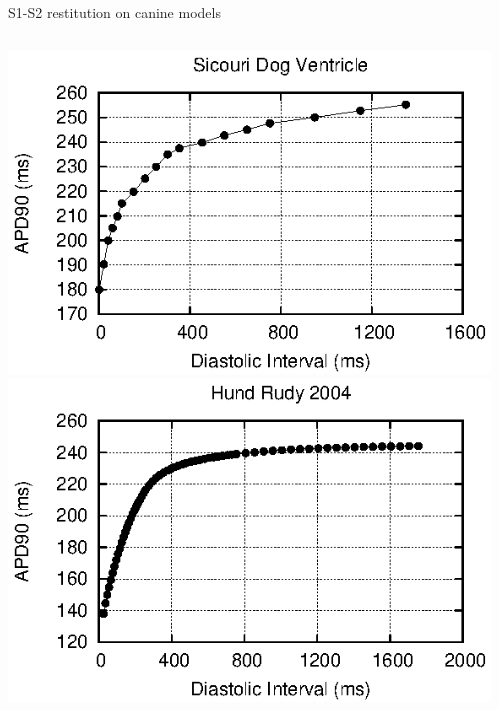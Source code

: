 \documentclass[t,xcolor={usenames,dvipsnames}]{beamer}
\begin{document}
\begin{frame}{S1-S2 restitution on canine models}
\begin{columns}[T]
\begin{column}{.33\linewidth}
\begin{center}
\includegraphics[width=\textwidth]{sicouri_dog_ventricle_s1s2_curve}\\
\vspace{.1cm}
\includegraphics[width=\textwidth]{hund_rudy_2004_s1s2_curve}
\end{center}
\end{column}
\begin{column}{.33\linewidth}
\begin{center}

\end{center}
\end{column}
\end{columns}
\end{frame}
\end{document}
